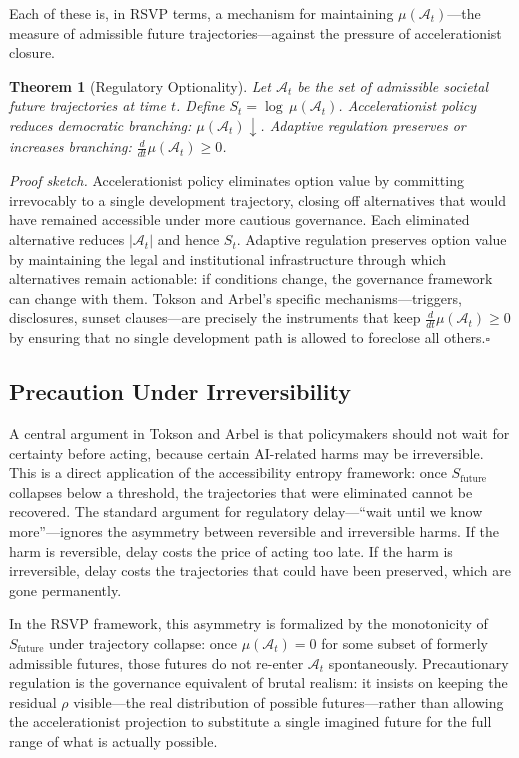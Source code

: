 \documentclass[12pt, a4paper]{article}
\theoremstyle{plain}
\newtheorem{theorem}{Theorem}
\theoremstyle{definition}
\theoremstyle{remark}
\begin{document}
Each of these is, in RSVP terms, a mechanism for maintaining $\mu(\mathcal{A}_t)$---the
measure of admissible future trajectories---against the pressure of accelerationist
closure.

\begin{theorem}[Regulatory Optionality]
Let $\mathcal{A}_t$ be the set of admissible societal future trajectories at time $t$.
Define $S_t = \log\,\mu(\mathcal{A}_t)$.
Accelerationist policy reduces democratic branching: $\mu(\mathcal{A}_t) \downarrow$.
Adaptive regulation preserves or increases branching:
$\tfrac{d}{dt}\mu(\mathcal{A}_t) \geq 0$.
\end{theorem}

\textit{Proof sketch.}
Accelerationist policy eliminates option value by committing irrevocably to a
single development trajectory, closing off alternatives that would have remained
accessible under more cautious governance.
Each eliminated alternative reduces $|\mathcal{A}_t|$ and hence $S_t$.
Adaptive regulation preserves option value by maintaining the legal and institutional
infrastructure through which alternatives remain actionable: if conditions change,
the governance framework can change with them.
Tokson and Arbel's specific mechanisms---triggers, disclosures, sunset clauses---are
precisely the instruments that keep $\frac{d}{dt}\mu(\mathcal{A}_t) \geq 0$
by ensuring that no single development path is allowed to foreclose all others.\hfill$\square$

\subsection{Precaution Under Irreversibility}

A central argument in Tokson and Arbel is that policymakers should not wait for
certainty before acting, because certain AI-related harms may be irreversible.
This is a direct application of the accessibility entropy framework: once
$S_{\mathrm{future}}$ collapses below a threshold, the trajectories that were
eliminated cannot be recovered.
The standard argument for regulatory delay---``wait until we know more''---ignores
the asymmetry between reversible and irreversible harms.
If the harm is reversible, delay costs the price of acting too late.
If the harm is irreversible, delay costs the trajectories that could have been
preserved, which are gone permanently.

In the RSVP framework, this asymmetry is formalized by the monotonicity of
$S_{\mathrm{future}}$ under trajectory collapse: once $\mu(\mathcal{A}_t) = 0$
for some subset of formerly admissible futures, those futures do not re-enter
$\mathcal{A}_t$ spontaneously.
Precautionary regulation is the governance equivalent of brutal realism: it
insists on keeping the residual $\rho$ visible---the real distribution of possible
futures---rather than allowing the accelerationist projection to substitute a
single imagined future for the full range of what is actually possible.
\end{document}
